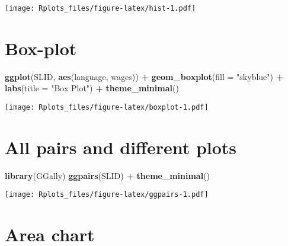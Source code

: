 \documentclass[]{article}
\newenvironment{Shaded}{\begin{snugshade}}{\end{snugshade}}
\newcommand{\KeywordTok}[1]{\textcolor[rgb]{0.13,0.29,0.53}{\textbf{#1}}}
\newcommand{\DataTypeTok}[1]{\textcolor[rgb]{0.13,0.29,0.53}{#1}}
\newcommand{\DecValTok}[1]{\textcolor[rgb]{0.00,0.00,0.81}{#1}}
\newcommand{\StringTok}[1]{\textcolor[rgb]{0.31,0.60,0.02}{#1}}
\newcommand{\OperatorTok}[1]{\textcolor[rgb]{0.81,0.36,0.00}{\textbf{#1}}}
\newcommand{\NormalTok}[1]{#1}
\begin{document}
\texttt{[image: Rplots\_files/figure-latex/hist-1.pdf]}

\section{Box-plot}\label{box-plot}

\begin{Shaded}
\begin{Highlighting}[]
\KeywordTok{ggplot}\NormalTok{(SLID, }\KeywordTok{aes}\NormalTok{(language, wages)) }\OperatorTok{+}\StringTok{ }\KeywordTok{geom_boxplot}\NormalTok{(}\DataTypeTok{fill =} \StringTok{"skyblue"}\NormalTok{) }\OperatorTok{+}\StringTok{ }\KeywordTok{labs}\NormalTok{(}\DataTypeTok{title =} \StringTok{"Box Plot"}\NormalTok{) }\OperatorTok{+}\StringTok{ }
\StringTok{    }\KeywordTok{theme_minimal}\NormalTok{()}
\end{Highlighting}
\end{Shaded}

\texttt{[image: Rplots\_files/figure-latex/boxplot-1.pdf]}

\section{All pairs and different
plots}\label{all-pairs-and-different-plots}

\begin{Shaded}
\begin{Highlighting}[]
\KeywordTok{library}\NormalTok{(GGally)}
\KeywordTok{ggpairs}\NormalTok{(SLID) }\OperatorTok{+}\StringTok{ }\KeywordTok{theme_minimal}\NormalTok{()}
\end{Highlighting}
\end{Shaded}

\texttt{[image: Rplots\_files/figure-latex/ggpairs-1.pdf]}

\section{Area chart}\label{area-chart}

\begin{Shaded}
\end{Shaded}
\end{document}
